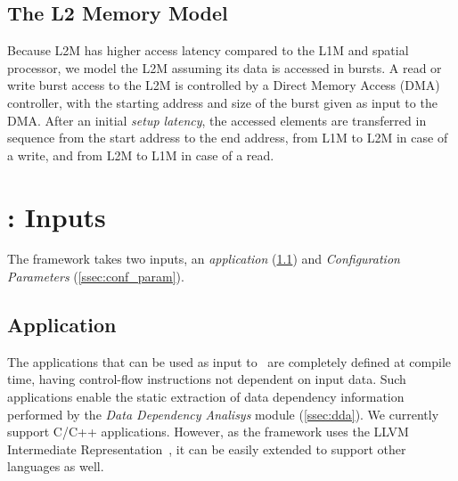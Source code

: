 

\vspace{-1mm}
\subsection{The L2 Memory Model}
\label{ssec:layer2_model}
\vspace{-1mm}
Because L2M has higher access latency compared to the L1M and spatial processor, we model the L2M assuming its data is accessed in bursts.
A read or write burst access to the L2M is controlled by a Direct Memory Access (DMA) controller, with the starting address and size of the burst given as input to the DMA. After an initial \textit{setup latency}, the accessed elements are transferred in sequence from the start address to the end address, from L1M to L2M in case of a write, and from L2M to L1M in case of a read.

\section{\frameworkname: Inputs}
The framework takes two inputs, an \textit{application} (\ref{ssec:app}) and \textit{Configuration Parameters} (\ref{ssec:conf_param}).
\vspace{-1mm}
\subsection{Application}
\label{ssec:app}
\vspace{-1mm}
The applications that can be used as input to \frameworkname~are completely defined at compile time, having control-flow instructions not dependent on input data. Such applications enable the static extraction of data dependency information performed by the \textit{Data Dependency Analisys} module (\ref{ssec:dda}). We currently support C/C++ applications. However, as the framework uses the LLVM Intermediate Representation~\cite{llvm}, it can be easily extended to support other languages as well.

